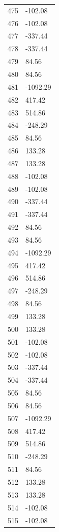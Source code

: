 \documentclass[a4paper,11pt]{article}
\begin{document}
\begin{center}
\begin{longtable}{|R{1.5cm}|R{2.5cm}|}
  475 &      -102.08 \\
  476 &      -102.08 \\
  477 &      -337.44 \\
  478 &      -337.44 \\
  479 &        84.56 \\
  480 &        84.56 \\
  481 &     -1092.29 \\
  482 &       417.42 \\
  483 &       514.86 \\
  484 &      -248.29 \\
  485 &        84.56 \\
  486 &       133.28 \\
  487 &       133.28 \\
  488 &      -102.08 \\
  489 &      -102.08 \\
  490 &      -337.44 \\
  491 &      -337.44 \\
  492 &        84.56 \\
  493 &        84.56 \\
  494 &     -1092.29 \\
  495 &       417.42 \\
  496 &       514.86 \\
  497 &      -248.29 \\
  498 &        84.56 \\
  499 &       133.28 \\
  500 &       133.28 \\
  501 &      -102.08 \\
  502 &      -102.08 \\
  503 &      -337.44 \\
  504 &      -337.44 \\
  505 &        84.56 \\
  506 &        84.56 \\
  507 &     -1092.29 \\
  508 &       417.42 \\
  509 &       514.86 \\
  510 &      -248.29 \\
  511 &        84.56 \\
  512 &       133.28 \\
  513 &       133.28 \\
  514 &      -102.08 \\
  515 &      -102.08 \\

\end{longtable}
\end{center}
\end{document}
